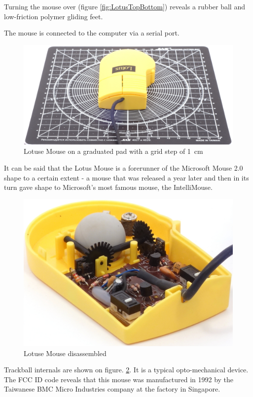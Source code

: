 \documentclass[11pt, a4paper]{article}
\begin{document}
Turning the mouse over (figure \ref{fig:LotusTopBottom}) reveals a rubber ball and low-friction polymer gliding feet.

The mouse is connected to the computer via a serial port.

\begin{figure}[h]
    \centering
    \includegraphics[scale=0.3]{1992_lotus_mouse/size_30.jpg}
    \caption{Lotuse Mouse on a graduated pad with a grid step of 1~cm}
    \label{fig:LotusSize}
\end{figure}

It can be said that the Lotus Mouse is a forerunner of the Microsoft Mouse 2.0 shape to a certain extent - a mouse that was released a year later and then in its turn gave shape to Microsoft's most famous mouse, the IntelliMouse.

\begin{figure}[h]
    \centering
    \includegraphics[scale=0.7]{1992_lotus_mouse/inside_30.jpg}
    \caption{Lotuse Mouse disassembled}
    \label{fig:LotusInside}
\end{figure}

Trackball internals are shown on figure. \ref{fig:LotusInside}. It is a typical opto-mechanical device. The FCC ID code reveals that this mouse was manufactured in 1992 by the Taiwanese BMC Micro Industries company at the factory in Singapore.
\end{document}
